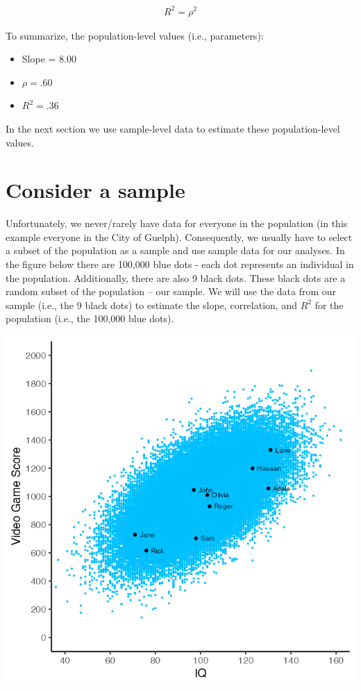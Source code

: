 \documentclass[
]{krantz}
\begin{document}
\[
\begin{aligned}
R^2  = \rho^2
\end{aligned}
\]

To summarize, the population-level values (i.e., parameters):

\begin{itemize}
\item
  Slope = 8.00
\item
  \(\rho = .60\)
\item
  \(R^2 = .36\)
\end{itemize}

In the next section we use sample-level data to estimate these population-level values.

\hypertarget{consider-a-sample}{%
\section{Consider a sample}\label{consider-a-sample}}

Unfortunately, we never/rarely have data for everyone in the population (in this example everyone in the City of Guelph). Consequently, we usually have to select a subset of the population as a sample and use sample data for our analyses. In the figure below there are 100,000 blue dots - each dot represents an individual in the population. Additionally, there are also 9 black dots. These black dots are a random subset of the population -- our sample. We will use the data from our sample (i.e., the 9 black dots) to estimate the slope, correlation, and \(R^2\) for the population (i.e., the 100,000 blue dots).

\includegraphics[width=0.7\linewidth]{ch_correlation/images/pop_sample_graph}
\end{document}
